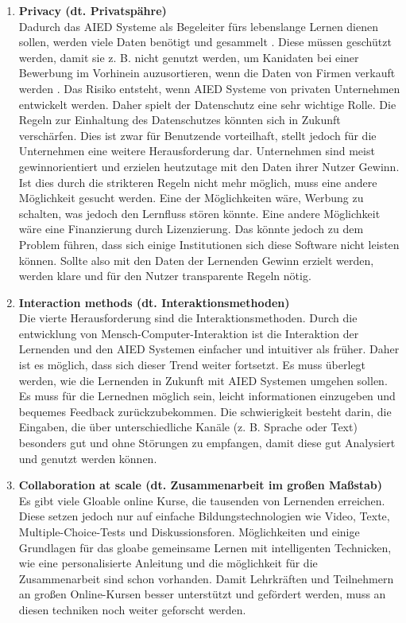 \begin{enumerate}
    \item \textbf{Privacy (dt. Privatspähre)} \\
          Dadurch das AIED Systeme als Begeleiter fürs lebenslange Lernen dienen sollen, werden viele Daten benötigt und gesammelt \cite[S. 10]{Pinkwart.2016}.
          Diese müssen geschützt werden, damit sie z. B. nicht genutzt werden, um Kanidaten bei einer Bewerbung im Vorhinein auzusortieren, wenn die Daten von Firmen verkauft werden \cite[S. 9f]{Pinkwart.2016}.
          Das Risiko entsteht, wenn AIED Systeme von privaten Unternehmen entwickelt werden. Daher spielt der Datenschutz eine sehr wichtige Rolle. Die Regeln zur Einhaltung des Datenschutzes könnten sich in Zukunft verschärfen.
          Dies ist zwar für Benutzende vorteilhaft, stellt jedoch für die Unternehmen eine weitere Herausforderung dar. Unternehmen sind meist gewinnorientiert und erzielen heutzutage mit den Daten ihrer Nutzer Gewinn.
          Ist dies durch die strikteren Regeln nicht mehr möglich, muss eine andere Möglichkeit gesucht werden. Eine der Möglichkeiten wäre, Werbung zu schalten, was jedoch den Lernfluss stören könnte.
          Eine andere Möglichkeit wäre eine Finanzierung durch Lizenzierung. Das könnte jedoch zu dem Problem führen, dass sich einige Institutionen sich diese Software nicht leisten können.
          Sollte also mit den Daten der Lernenden Gewinn erzielt werden, werden klare und für den Nutzer transparente Regeln nötig. \cite[S. 10f]{Pinkwart.2016}

    \item \textbf{Interaction methods (dt. Interaktionsmethoden)} \\
          Die vierte Herausforderung sind die Interaktionsmethoden. Durch die entwicklung von Mensch-Computer-Interaktion ist die Interaktion der Lernenden und den AIED Systemen einfacher und intuitiver als früher.
          Daher ist es möglich, dass sich dieser Trend weiter fortsetzt. Es muss überlegt werden, wie die Lernenden in Zukunft mit AIED Systemen umgehen sollen.
          Es muss für die Lernednen möglich sein, leicht informationen einzugeben und bequemes Feedback zurückzubekommen.
          Die schwierigkeit besteht darin, die Eingaben, die über unterschiedliche Kanäle (z. B. Sprache oder Text) besonders gut und ohne Störungen zu empfangen, damit diese gut Analysiert und genutzt werden können. \cite[S. 11]{Pinkwart.2016}

    \item \textbf{Collaboration at scale (dt. Zusammenarbeit im großen Maßstab)} \\
          Es gibt viele Gloable online Kurse, die tausenden von Lernenden erreichen. Diese setzen jedoch nur auf einfache Bildungstechnologien wie Video, Texte, Multiple-Choice-Tests und Diskussionsforen.
          Möglichkeiten und einige Grundlagen für das gloabe gemeinsame Lernen mit intelligenten Technicken, wie eine personalisierte Anleitung und die möglichkeit für die Zusammenarbeit sind schon vorhanden.
          Damit Lehrkräften und Teilnehmern an großen Online-Kursen besser unterstützt und gefördert werden, muss an diesen techniken noch weiter geforscht werden. \cite[S. 11]{Pinkwart.2016}


\end{enumerate}
